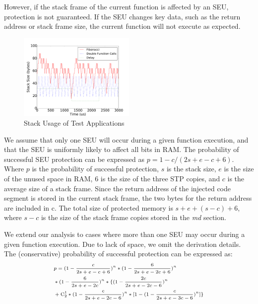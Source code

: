 However, if the stack frame of the current function is affected by an SEU, protection is not guaranteed. If the SEU changes key data, such as the return address or stack frame size, the current function will not execute as expected. 
\begin{figure}
	\vspace{-25pt}
	\begin{center}
		\includegraphics[width=0.50\textwidth]{figures/stacksize_usage_v3.pdf}
	\end{center}
	\vspace{-20pt}
	\caption{Stack Usage of Test Applications}\label{fig:stacksize_usage}
	\vspace{-25pt}
\end{figure}
We assume that only one SEU will occur during a given function execution, and that the SEU is uniformly likely to affect all bits in RAM. The probability of successful SEU protection can be expressed as $p=1-c/(2s+e-c+6)$. Where $p$ is the probability of successful protection, $s$ is the stack size, $e$ is the size of the unused space in RAM, $6$ is the size of the three STP copies, and $c$ is the average size of a stack frame. Since the return address of the injected code segment is stored in the current stack frame, the two bytes for the return address are included in c. The total size of protected memory is $s+e+(s-c)+6$, where $s-c$ is the size of the stack frame copies stored in the \textit{md} section.

We extend our analysis to cases where more than one SEU may occur during a given function execution. Due to lack of space, we omit the derivation details. The (conservative) probability of successful protection can be expressed as:
\vspace{-5pt}
\begin{equation}\label{eq_seu2}
\scriptsize
\begin{split}
&p=(1-\frac{c}{2s+e-c+6})^n*(1-\frac{6}{2s+e-2c+6})^n \\
&*(1-\frac{6}{2s+e-2c})^n*\{(1-\frac{2c}{2s+e-2c-6})^n \\
&+ \mathrm{C}_2^1*(1-\frac{c}{2s+e-2c-6})^n*[1-(1-\frac{c}{2s+e-3c-6})^n]\}
\end{split}
\end{equation}

